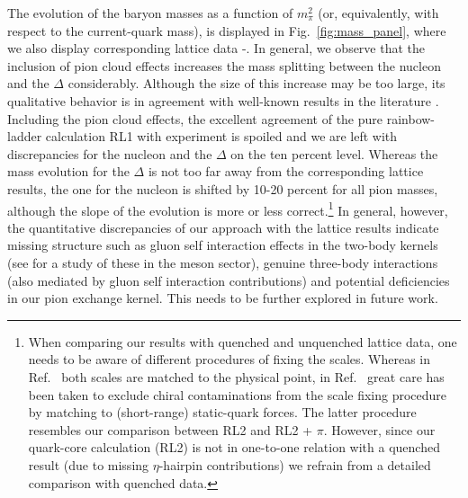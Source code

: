 The evolution of the baryon masses as a function of $m_\pi^2$ (or, equivalently, 
with respect to the current-quark mass), is displayed in Fig.~\ref{fig:mass_panel},
where we also display corresponding lattice data \cite{Alexandrou:2006ru}-\cite{Gattringer:2008vj}.
In general, we observe that the inclusion of pion cloud effects increases the mass 
splitting between the nucleon and the $\Delta$ considerably. Although the size of 
this increase may be too large, its qualitative behavior is in agreement with
well-known results in the literature \cite{Thomas:1981vc}. Including the pion
cloud effects, the excellent agreement of the pure rainbow-ladder calculation RL1
with experiment is spoiled and we are left with discrepancies for the nucleon
and the $\Delta$ on the ten percent level. Whereas the mass evolution for the 
$\Delta$ is not too far away from the corresponding lattice results, the one
for the nucleon is shifted by 10-20 percent for all pion masses, although the slope 
of the evolution is more or less correct.\footnote{When comparing our results with 
quenched and unquenched lattice data, 
one needs to be aware of different procedures of fixing the scales. Whereas in 
Ref.~\cite{Alexandrou:2009hs} both scales are matched to the physical point, in
Ref.~\cite{Young:2002cj} great care has been taken to exclude chiral contaminations
from the scale fixing procedure by matching to (short-range) static-quark forces.
The latter procedure resembles our comparison between RL2 and RL2 + $\pi$. 
However, since our quark-core calculation (RL2) is not in one-to-one 
relation with a quenched result (due to missing $\eta$-hairpin contributions)
we refrain from a detailed comparison with quenched data.}
In general, however, the quantitative discrepancies of our approach with the lattice 
results indicate missing structure such as gluon self interaction effects in the
two-body kernels (see \cite{Fischer:2009jm} for a study of these in the meson 
sector), genuine three-body interactions (also mediated by gluon self interaction
contributions) and potential deficiencies in our pion exchange kernel. This
needs to be further explored in future work.  
